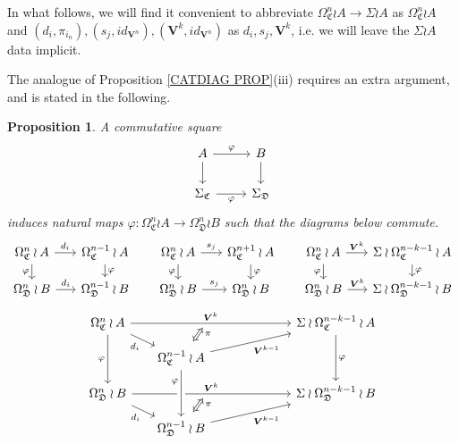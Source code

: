 \documentclass[a4paper,10pt
,draft
]{article}%
\numberwithin{equation}{section}
\numberwithin{figure}{section}
\newtheorem{proposition}[equation]{Proposition}%
\theoremstyle{definition} %
\newcommand{\1}{\ensuremath{\mathbbm 1}}%
\begin{document}
In what follows, we will find it convenient to abbreviate
$\Omega_{\mathfrak{C}}^n \wr A \to \Sigma \wr A$
as 
$\Omega_{\mathfrak{C}}^n \wr A$
and
$(d_i,\pi_{i_n}), (s_j,id_{\boldsymbol{V}^n}),
(\boldsymbol{V}^k,id_{\boldsymbol{V}^n})
$
as 
$d_i,s_j,\boldsymbol{V}^k$, 
i.e. we will leave the $\Sigma \wr A$
data implicit.

The analogue of Proposition \ref{CATDIAG PROP}(iii) requires an extra argument, and is stated in the following.


\begin{proposition}\label{SPANPIECE PROP}
	A commutative square
	\begin{equation}\label{SPANPIECE EQ}
	\begin{tikzcd}
	A \ar{d} \ar{r}{\varphi} &  \ar{d} B
	\\
	\Sigma_{\mathfrak{C}} \ar{r}[swap]{\varphi} & \Sigma_{\mathfrak{D}}
	\end{tikzcd}
	\end{equation}
	induces natural maps 
	$\varphi \colon
	\Omega_{\mathfrak{C}}^n \wr A \to 
	\Omega_{\mathfrak{D}}^n \wr B $
	such that the diagrams below commute.
	\[
	\begin{tikzcd}[column sep = 16pt, row sep = 10pt]
	\Omega^n_{\mathfrak{C}} \wr A \ar{r}{d_i} \ar{d}[swap]{\varphi} &
	\Omega^{n-1}_{\mathfrak{C}} \wr A \ar{d}{\varphi}
	&
	\Omega^n_{\mathfrak{C}} \wr A \ar{r}{s_j} \ar{d}[swap]{\varphi} &
	\Omega^{n+1}_{\mathfrak{C}}\wr A \ar{d}{\varphi}
	&
	\Omega^n_{\mathfrak{C}} \wr A \ar{r}{\boldsymbol{V}^k} \ar{d}[swap]{\varphi} &
	\Sigma \wr \Omega^{n-k-1}_{\mathfrak{C}} \wr A \ar{d}{\varphi}
	\\
	\Omega^n_{\mathfrak{D}} \wr B \ar{r}{d_i} &
	\Omega^{n-1}_{\mathfrak{D}} \wr B
	&
	\Omega^n_{\mathfrak{D}} \wr B \ar{r}{s_j} &
	\Omega^n_{\mathfrak{D}} \wr B
	&
	\Omega^n_{\mathfrak{D}} \wr B \ar{r}{\boldsymbol{V}^k} &
	\Sigma \wr \Omega^{n-k-1}_{\mathfrak{D}} \wr B
	\end{tikzcd}
	\]
	\[
	\begin{tikzcd}[column sep = 16pt, row sep = small]
	\Omega^n_{\mathfrak{C}} \wr A
	\ar{rrrrr}[name=toE]{\boldsymbol{V}^k} \ar{rd}[swap]{d_i} \ar{dd}[swap]{\varphi}
	&&&
	&&
	\Sigma \wr \Omega^{n-k-1}_{\mathfrak{C}} \wr A  \ar{dd}{\varphi}
	\\
	&
	|[alias=DBE]|
	\Omega^{n-1}_{\mathfrak{C}} \wr A \ar{rrrru}[swap]{\boldsymbol{V}^{k-1}}
	\\
	\Omega^n_{\mathfrak{D}} \wr B \ar{rrrrr}[name=toB]{\boldsymbol{V}^k} \ar{rd}[swap]{d_i}
	&&&
	&&
	\Sigma \wr \Omega^{n-k-1}_{\mathfrak{D}} \wr B
	\\
	&
	|[alias=D]| \Omega^{n-1}_{\mathfrak{D}} \wr B \ar{rrrru}[swap]{\boldsymbol{V}^{k-1}}
	\arrow[Leftrightarrow, from=DBE, to=toE, shorten <=0.15cm,shorten >=0.15cm
	,swap,near end,"\pi"
	]
	\arrow[Leftrightarrow, from=D, to=toB, shorten <=0.15cm,shorten >=0.15cm,swap,near end,"\pi"]
	\arrow[from=DBE, to=D, crossing over, near start, swap, "\varphi"]
	\end{tikzcd}
	\]
\end{proposition}
\end{document}
